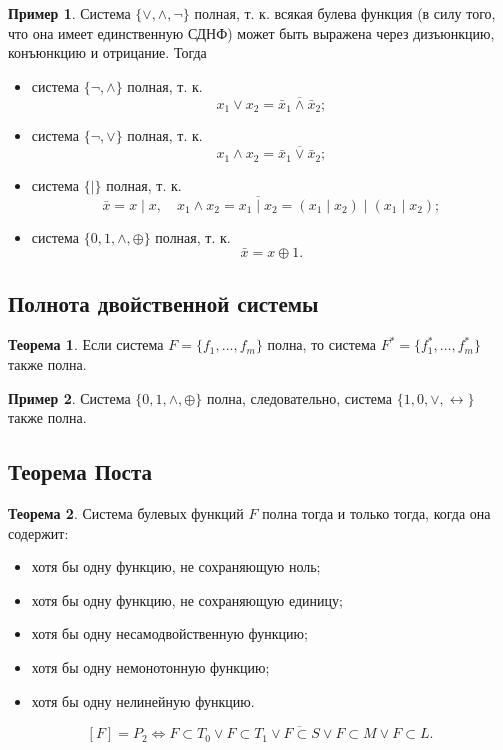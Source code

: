 \documentclass[a5paper, 11pt]{extarticle}
\theoremstyle{definition}
\newtheorem*{theorem*}{Теорема}
\newtheorem*{example*}{Пример}
\theoremstyle{definition}
\theoremstyle{definition}
\numberwithin{figure}{section}
\numberwithin{table}{section}
\begin{document}
\begin{example*}
    Система \(\{\lor, \land, \neg\}\) полная, т. к. всякая булева функция (в силу того, что она имеет единственную СДНФ) может быть выражена через дизъюнкцию, конъюнкцию и отрицание. Тогда
    \begin{itemize}
        \item система \(\{\neg, \land\}\) полная, т. к.
              \[
                  x_1 \lor x_2 = \overline{\bar{x}_1 \land \bar{x}_2};
              \]
        \item система \(\{\neg, \lor\}\) полная, т. к.
              \[
                  x_1 \land x_2 = \overline{\bar{x}_1 \lor \bar{x}_2};
              \]
        \item система \(\{\mid\}\) полная, т. к.
              \[
                  \bar{x} = x \mid x,
                  \quad
                  x_1 \land x_2 = \overline{x_1 \mid x_2} = (x_1 \mid x_2) \mid (x_1 \mid x_2);
              \]
        \item система \(\{0, 1, \land, \oplus\}\) полная, т. к.
              \[
                  \bar{x} = x \oplus 1.
              \]
    \end{itemize}
\end{example*}

\subsection{Полнота двойственной системы}

\begin{theorem*}
    Если система \(F = \{f_1, \ldots, f_m\}\) полна, то система \(F^* = \{f_1^*, \ldots, f_m^*\}\) также полна.
\end{theorem*}

\begin{example*}
    Система \(\{0, 1, \land, \oplus\}\) полна, следовательно, система \(\{1, 0, \lor, \leftrightarrow\}\) также полна.
\end{example*}

\subsection{Теорема Поста}

\begin{theorem*}
    Система булевых функций \(F\) полна тогда и только тогда, когда она содержит:
    \begin{itemize}
        \item хотя бы одну функцию, не сохраняющую ноль;
        \item хотя бы одну функцию, не сохраняющую единицу;
        \item хотя бы одну несамодвойственную функцию;
        \item хотя бы одну немонотонную функцию;
        \item хотя бы одну нелинейную функцию.
    \end{itemize}

    \[
        [F] = P_2
        \iff
        \overline{F \subset T_0 \lor F \subset T_1 \lor F \subset S \lor F \subset M \lor F \subset L}.
    \]
\end{theorem*}
\end{document}
